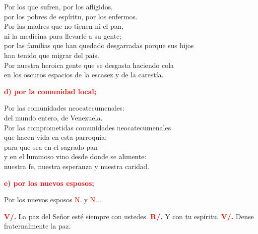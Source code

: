 \documentclass[12pt, letterpaper, spanish]{report}
\begin{document}
\Large Por los que sufren, por los afligidos, \\
por los pobres de esp\'iritu, por los enfermos. \\
Por las madres que no tienen ni el pan, \\
ni la medicina para llevarle a su gente; \\
por las familias que han quedado desgarradas porque sus hijos \\
han tenido que migrar del pa\'is. \\
Por nuestra heroica gente que se desgasta haciendo cola \\
en los oscuros espacios de la escasez y de la carest\'ia.\newline

\large {\bfseries \textcolor{red}{d) por la comunidad local;}} \newline

\Large Por las comunidades neocatecumenales: \\
del mundo entero, de Venezuela. \\
Por las comprometidas comunidades neocatecumenales \\
que hacen vida en esta parroquia; \\
para que sea en el sagrado pan \\
y en el luminoso vino desde donde se alimente: \\
nuestra fe, nuestra esperanza y nuestra caridad.\newline

\large {\bfseries \textcolor{red}{e) por los nuevos esposos;}} \newline

\Large Por los nuevos esposos \textcolor{red}{N.} y \textcolor{red}{N.}...\newline

\Large \hspace{-0.9cm} {\bfseries \textcolor{red}{V/.}} \hspace{0.5cm} La paz del Se\~nor est\'e siempre con ustedes. \newline
\Large \hspace{-0.9cm} {\bfseries \textcolor{red}{R/.}} \hspace{0.5cm} Y con tu esp\'iritu. \newline
\Large \hspace{-0.9cm} {\bfseries \textcolor{red}{V/.}} \hspace{0.5cm} Dense fraternalmente la paz. \newline
\end{document}
